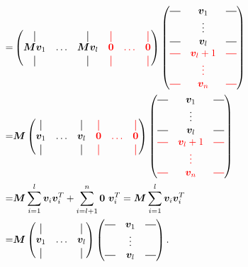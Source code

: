 \begin{align}
    =&
    \begin{pmatrix}
    \vertbar       &        & \vertbar       & \red{\vertbar} & \red{        } & \red{\vertbar} \\
    \bm{M}\bm{v}_1 & \hdots & \bm{M}\bm{v}_l & \red{\bm{0}  } & \red{ \hdots } & \red{\bm{0}}   \\
    \vertbar       &        & \vertbar       & \red{\vertbar} & \red{        } & \red{\vertbar}
    \end{pmatrix}
    \begin{pmatrix}
        \horzbar & \bm{v}_1   & \horzbar \\
                 & \vdots     &          \\
        \horzbar & \bm{v}_l   & \horzbar \\
        \red{\horzbar} & \red{\bm{v}_l+1} & \red{\horzbar} \\
                       & \red{\vdots    } &                \\
        \red{\horzbar} & \red{\bm{v}_n  } & \red{\horzbar} \\
    \end{pmatrix}\\
    =& \bm{M}\begin{pmatrix}
    \vertbar       &        & \vertbar       & \red{\vertbar} & \red{        } & \red{\vertbar} \\
    \bm{v}_1 & \hdots & \bm{v}_l & \red{\bm{0}  } & \red{ \hdots } & \red{\bm{0}}   \\
    \vertbar       &        & \vertbar       & \red{\vertbar} & \red{        } & \red{\vertbar}
    \end{pmatrix}
    \begin{pmatrix}
        \horzbar & \bm{v}_1   & \horzbar \\
                 & \vdots     &          \\
        \horzbar & \bm{v}_l   & \horzbar \\
        \red{\horzbar} & \red{\bm{v}_l+1} & \red{\horzbar} \\
                       & \red{\vdots    } &                \\
        \red{\horzbar} & \red{\bm{v}_n  } & \red{\horzbar} \\
    \end{pmatrix} \\
    =&
    \bm{M} \sum_{i=1}^l \bm{v}_i \bm{v}_i^T + \sum_{i=l+1}^n \bm{0} \ \bm{v}_i^T =
    \bm{M} \sum_{i=1}^l \bm{v}_i \bm{v}_i^T  \\
    =&     \bm{M}
    \begin{pmatrix}
    \vertbar &        & \vertbar \\
    \bm{v}_1 & \hdots & \bm{v}_l \\
    \vertbar &        & \vertbar 
    \end{pmatrix}
    \begin{pmatrix}
        \horzbar & \bm{v}_1 & \horzbar \\
                  & \vdots   &  \\
        \horzbar & \bm{v}_l &  \horzbar \\
    \end{pmatrix}.
\end{align}
